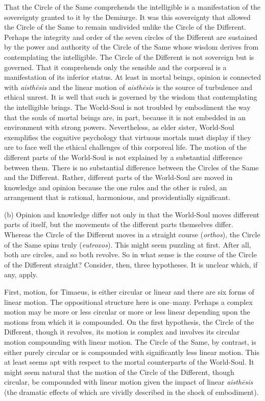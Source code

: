 That the Circle of the Same comprehends the intelligible is a manifestation of the sovereignty granted to it by the Demiurge. It was this sovereignty that allowed the Circle of the Same to remain undivided unlike the Circle of the Different. Perhaps the integrity and order of the seven circles of the Different are sustained by the power and authority of the Circle of the Same whose wisdom derives from contemplating the intelligible. The Circle of the Different is not sovereign but is governed. That it comprehends only the sensible and the corporeal is a manifestation of its inferior status. At least in mortal beings, opinion is connected with \emph{aisthēsis} and the linear motion of \emph{aisthēsis} is the source of turbulence and ethical unrest. It is well that such is governed by the wisdom that contemplating the intelligible brings. The World-Soul is not troubled by embodiment the way that the souls of mortal beings are, in part, because it is not embedded in an environment with strong powers. Nevertheless, as elder sister, World-Soul exemplifies the cognitive psychology that virtuous mortals must display if they are to face well the ethical challenges of this corporeal life. The motion of the different parts of the World-Soul is not explained by a substantial difference between them. There is no substantial difference between the Circles of the Same and the Different. Rather, different parts of the World-Soul are moved in knowledge and opinion because the one rules and the other is ruled, an arrangement that is rational, harmonious, and providentially significant.

(b) Opinion and knowledge differ not only in that the World-Soul moves different parts of itself, but the movements of the different parts themselves differ. Whereas the Circle of the Different moves in a straight course (\emph{orthos}), the Circle of the Same spins truly (\emph{eutroxos}). This might seem puzzling at first. After all, both are circles, and so both revolve. So in what sense is the course of the Circle of the Different straight? Consider, then, three hypotheses. It is unclear which, if any, apply.

First, motion, for Timaeus, is either circular or linear and there are six forms of linear motion. The oppositional structure here is one--many. Perhaps a complex motion may be more or less circular or more or less linear depending upon the motions from which it is compounded. On the first hypothesis, the Circle of the Different, though it revolves, its motion is complex and involves its circular motion compounding with linear motion. The Circle of the Same, by contrast, is either purely circular or is compounded with significantly less linear motion. This at least seems apt with respect to the mortal counterparts of the World-Soul. It might seem natural that the motion of the Circle of the Different, though circular, be compounded with linear motion given the impact of linear \emph{aisthēsis} (the dramatic effects of which are vividly described in the shock of embodiment).

